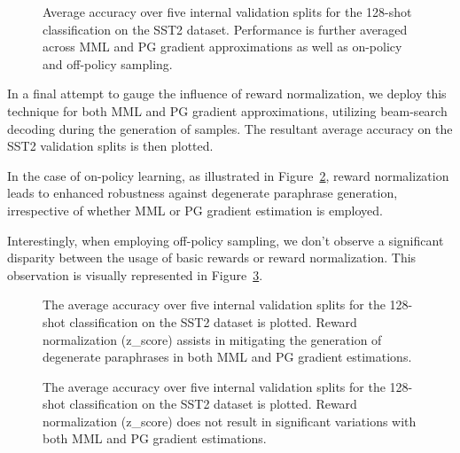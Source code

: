 \documentclass[11pt]{article}
\begin{document}
\begin{figure}[h]
\begin{center}

\end{center}
\caption{Average accuracy over five internal validation splits for the 128-shot classification on the SST2 dataset. Performance is further averaged across MML and PG gradient approximations as well as on-policy and off-policy sampling.}
\label{beam-search-top-mixed}
\end{figure}

In a final attempt to gauge the influence of reward normalization, we deploy this technique for both MML and PG gradient approximations, utilizing beam-search decoding during the generation of samples. The resultant average accuracy on the SST2 validation splits is then plotted.

In the case of on-policy learning, as illustrated in Figure~\ref{zscore-on-policy}, reward normalization leads to enhanced robustness against degenerate paraphrase generation, irrespective of whether MML or PG gradient estimation is employed.

Interestingly, when employing off-policy sampling, we don't observe a significant disparity between the usage of basic rewards or reward normalization. This observation is visually represented in Figure~\ref{zscore-off-policy}.

\begin{figure}[h]
\begin{center}

\end{center}
\caption{The average accuracy over five internal validation splits for the 128-shot classification on the SST2 dataset is plotted. Reward normalization (z\_score) assists in mitigating the generation of degenerate paraphrases in both MML and PG gradient estimations.}
\label{zscore-on-policy}
\end{figure}

\begin{figure}[h]
\begin{center}

\end{center}
\caption{The average accuracy over five internal validation splits for the 128-shot classification on the SST2 dataset is plotted. Reward normalization (z\_score) does not result in significant variations with both MML and PG gradient estimations.}
\label{zscore-off-policy}
\end{figure}
\end{document}
